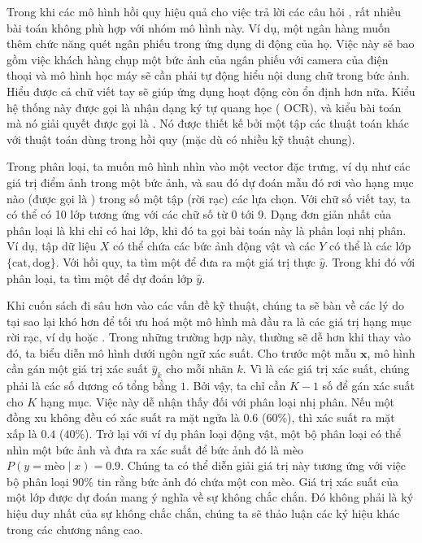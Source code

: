 \documentclass[letterpaper,11pt,english]{sphinxmanual}
\begin{document}
Trong khi các mô hình hồi quy hiệu quả cho việc trả lời các câu hỏi , rất nhiều bài toán không phù hợp với nhóm mô hình này. Ví
dụ, một ngân hàng muốn thêm chức năng quét ngân phiếu trong ứng dụng di
động của họ. Việc này sẽ bao gồm việc khách hàng chụp một bức ảnh của
ngân phiếu với camera của điện thoại và mô hình học máy sẽ cần phải tự
động hiểu nội dung chữ trong bức ảnh. Hiểu được cả chữ viết tay sẽ giúp
ứng dụng hoạt động còn ổn định hơn nữa. Kiểu hệ thống này được gọi là
nhận dạng ký tự quang học ( \textendash{} OCR), và
kiểu bài toán mà nó giải quyết được gọi là . Nó được thiết kế
bởi một tập các thuật toán khác với thuật toán dùng trong hồi quy (mặc
dù có nhiều kỹ thuật chung).



Trong phân loại, ta muốn mô hình nhìn vào một vector đặc trưng, ví dụ
như các giá trị điểm ảnh trong một bức ảnh, và sau đó dự đoán mẫu đó rơi
vào hạng mục nào (được gọi là ) trong số một tập (rời rạc) các lựa
chọn. Với chữ số viết tay, ta có thể có 10 lớp tương ứng với các chữ số
từ 0 tới 9. Dạng đơn giản nhất của phân loại là khi chỉ có hai lớp, khi
đó ta gọi bài toán này là phân loại nhị phân. Ví dụ, tập dữ liệu
\(X\) có thể chứa các bức ảnh động vật và các  \(Y\) có
thể là các lớp \(\mathrm{\{cat, dog\}}\). Với hồi quy, ta tìm một
 để đưa ra một giá trị thực \(\hat{y}\). Trong khi đó
với phân loại, ta tìm một  để dự đoán lớp \(\hat{y}\).



Khi cuốn sách đi sâu hơn vào các vấn đề kỹ thuật, chúng ta sẽ bàn về các
lý do tại sao lại khó hơn để tối ưu hoá một mô hình mà đầu ra là các giá
trị hạng mục rời rạc, ví dụ  hoặc . Trong những trường hợp
này, thường sẽ dễ hơn khi thay vào đó, ta biểu diễn mô hình dưới ngôn
ngữ xác suất. Cho trước một mẫu \(\mathbf{x}\), mô hình cần gán một
giá trị xác suất \(\hat{y}_k\) cho mỗi nhãn \(k\). Vì là các giá
trị xác suất, chúng phải là các số dương có tổng bằng \(1\). Bởi
vậy, ta chỉ cần \(K-1\) số để gán xác suất cho \(K\) hạng mục.
Việc này dễ nhận thấy đối với phân loại nhị phân. Nếu một đồng xu không
đều có xác suất ra mặt ngửa là \(0.6\) (\(60\%\)), thì xác suất
ra mặt xấp là \(0.4\) (\(40\%\)). Trở lại với ví dụ phân loại
động vật, một bộ phân loại có thể nhìn một bức ảnh và đưa ra xác suất để
bức ảnh đó là mèo \(P(y=\text{mèo} \mid x) = 0.9\). Chúng ta có thể
diễn giải giá trị này tương ứng với việc bộ phân loại \(90\%\) tin
rằng bức ảnh đó chứa một con mèo. Giá trị xác suất của một lớp được dự
đoán mang ý nghĩa về sự không chắc chắn. Đó không phải là ký hiệu duy
nhất của sự không chắc chắn, chúng ta sẽ thảo luận các ký hiệu khác
trong các chương nâng cao.
\end{document}

